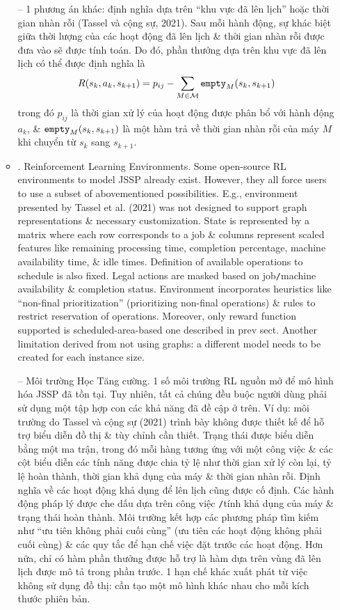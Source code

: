 \documentclass{article}
\begin{document}
\begin{itemize}
\begin{itemize}
        -- 1 phương án khác: định nghĩa dựa trên ``khu vực đã lên lịch'' hoặc thời gian nhàn rỗi (Tassel và cộng sự, 2021). Sau mỗi hành động, sự khác biệt giữa thời lượng của các hoạt động đã lên lịch \& thời gian nhàn rỗi được đưa vào sẽ được tính toán. Do đó, phần thưởng dựa trên khu vực đã lên lịch có thể được định nghĩa là
        \begin{equation*}
            R(s_k,a_k,s_{k+1}) = p_{ij} - \sum_{M\in{\cal M}} {\tt empty}_M(s_k,s_{k+1})
        \end{equation*}
        trong đó $p_{ij}$ là thời gian xử lý của hoạt động được phân bổ với hành động $a_k$, \& ${\tt empty}_M(s_k,s_{k+1})$ là một hàm trả về thời gian nhàn rỗi của máy $M$ khi chuyển từ $s_k$ sang $s_{k+1}$.
        \item {. Reinforcement Learning Environments.} Some open-source RL environments to model JSSP already exist. However, they all force users to use a subset of abovementioned possibilities. E.g., environment presented by Tassel et al. (2021) was not designed to support graph representations \& necessary customization. State is represented by a matrix where each row corresponds to a job \& columns represent scaled features like remaining processing time, completion percentage, machine availability time, \& idle times. Definition of available operations to schedule is also fixed. Legal actions are masked based on job{\tt/}machine availability \& completion status. Environment incorporates heuristics like ``non-final prioritization'' (prioritizing non-final operations) \& rules to restrict reservation of operations. Moreover, only reward function supported is scheduled-area-based one described in prev sect. Another limitation derived from not using graphs: a different model needs to be created for each instance size.

        -- {\sf Môi trường Học Tăng cường.} 1 số môi trường RL nguồn mở để mô hình hóa JSSP đã tồn tại. Tuy nhiên, tất cả chúng đều buộc người dùng phải sử dụng một tập hợp con các khả năng đã đề cập ở trên. Ví dụ: môi trường do Tassel và cộng sự (2021) trình bày không được thiết kế để hỗ trợ biểu diễn đồ thị \& tùy chỉnh cần thiết. Trạng thái được biểu diễn bằng một ma trận, trong đó mỗi hàng tương ứng với một công việc \& các cột biểu diễn các tính năng được chia tỷ lệ như thời gian xử lý còn lại, tỷ lệ hoàn thành, thời gian khả dụng của máy \& thời gian nhàn rỗi. Định nghĩa về các hoạt động khả dụng để lên lịch cũng được cố định. Các hành động pháp lý được che dấu dựa trên công việc {\tt/}tính khả dụng của máy \& trạng thái hoàn thành. Môi trường kết hợp các phương pháp tìm kiếm như ``ưu tiên không phải cuối cùng'' (ưu tiên các hoạt động không phải cuối cùng) \& các quy tắc để hạn chế việc đặt trước các hoạt động. Hơn nữa, chỉ có hàm phần thưởng được hỗ trợ là hàm dựa trên vùng đã lên lịch được mô tả trong phần trước. 1 hạn chế khác xuất phát từ việc không sử dụng đồ thị: cần tạo một mô hình khác nhau cho mỗi kích thước phiên bản.


\end{itemize}
\end{itemize}
\end{document}
